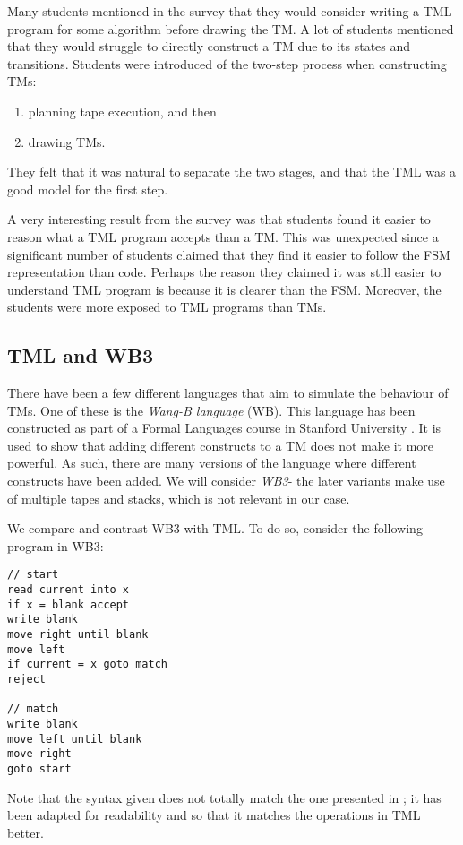 Many students mentioned in the survey that they would consider writing a TML program for some algorithm before drawing the TM. A lot of students mentioned that they would struggle to directly construct a TM due to its states and transitions. Students were introduced of the two-step process when constructing TMs:
\begin{enumerate}
    \item planning tape execution, and then
    \item drawing TMs.
\end{enumerate}
They felt that it was natural to separate the two stages, and that the TML was a good model for the first step.

A very interesting result from the survey was that students found it easier to reason what a TML program accepts than a TM. This was unexpected since a significant number of students claimed that they find it easier to follow the FSM representation than code. Perhaps the reason they claimed it was still easier to understand TML program is because it is clearer than the FSM. Moreover, the students were more exposed to TML programs than TMs.

\subsection{TML and WB3}
There have been a few different languages that aim to simulate the behaviour of TMs. One of these is the \emph{Wang-B language} (WB). This language has been constructed as part of a Formal Languages course in Stanford University \citep{stanford_WB}. It is used to show that adding different constructs to a TM does not make it more powerful. As such, there are many versions of the language where different constructs have been added. We will consider \emph{WB3}- the later variants make use of multiple tapes and stacks, which is not relevant in our case.

We compare and contrast WB3 with TML. To do so, consider the following program in WB3:
\begin{lstlisting}[language=WB]
// start
read current into x
if x = blank accept
write blank
move right until blank
move left
if current = x goto match
reject

// match
write blank
move left until blank
move right
goto start
\end{lstlisting}
Note that the syntax given does not totally match the one presented in \citet{stanford_WB}; it has been adapted for readability and so that it matches the operations in TML better.

